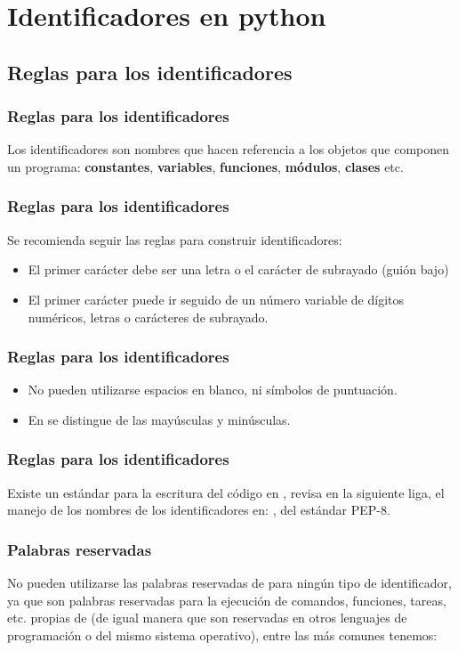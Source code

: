 \documentclass[12pt]{beamer}
\begin{document}
\section{Identificadores en python}
\subsection{Reglas para los identificadores}

\begin{frame}
\frametitle{Reglas para los identificadores}
Los identificadores son nombres que hacen referencia a los objetos que componen un programa: \textbf{constantes}, \textbf{variables}, \textbf{funciones}, \textbf{módulos}, \textbf{clases} etc.
\end{frame}
\begin{frame}
\frametitle{Reglas para los identificadores}
Se recomienda seguir las reglas para construir identificadores:
\begin{itemize}[<+->]
\item[\ding{212}] El primer carácter debe ser una letra o el carácter de subrayado (guión bajo)
\item[\ding{212}] El primer carácter puede ir seguido de un número variable de dígitos numéricos, letras o carácteres de subrayado.
\end{itemize}
\end{frame}
\begin{frame}
\frametitle{Reglas para los identificadores}
\begin{itemize}[<+->]
\item[\ding{212}] No pueden utilizarse espacios en blanco, ni símbolos de puntuación.
\item[\ding{212}] En \python{} se distingue de las mayúsculas y minúsculas.
\end{itemize}
\end{frame}
\begin{frame}
\frametitle{Reglas para los identificadores}
Existe un estándar para la escritura del código en \python, revisa en la siguiente liga, el manejo de los nombres de los identificadores en: \href{shorturl.at/fOUV7}{}, del estándar PEP-8.
\end{frame}
\begin{frame}
\frametitle{Palabras reservadas}
No pueden utilizarse las palabras reservadas de \python{} para ningún tipo de identificador, \pause ya que son palabras reservadas para la ejecución de comandos, funciones, tareas, etc. propias de \python{} (de igual manera que son reservadas en otros lenguajes de programación o del mismo sistema operativo), entre las más comunes tenemos:
\end{frame}
\end{document}
